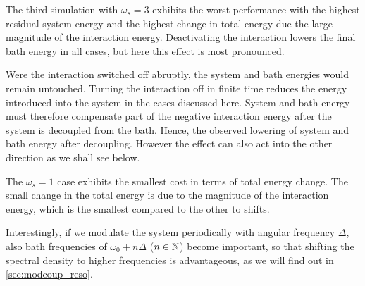 The third simulation with \(ω_s=3\) exhibits the worst performance
with the highest residual system energy and the highest change in
total energy due the large magnitude of the interaction energy.
Deactivating the interaction lowers the final bath energy in all
cases, but here this effect is most pronounced.

Were the interaction switched off abruptly, the system and bath
energies would remain untouched. Turning the interaction off in finite
time reduces the energy introduced into the system in the cases
discussed here. System and bath energy must therefore compensate part
of the negative interaction energy after the system is decoupled from
the bath. Hence, the observed lowering of system and bath energy after
decoupling. However the effect can also act into the other direction
as we shall see below.

The \(ω_{s}=1\) case exhibits the smallest cost in terms of total
energy change.  The small change in the total energy is due to the
magnitude of the interaction energy, which is the smallest compared to
the other to shifts.

Interestingly, if we modulate the system periodically with angular
frequency \(Δ\), also bath frequencies of \(ω_{0} + n Δ\)
(\(n\in\mathbb{N}\)) become important, so that shifting the spectral density
to higher frequencies is advantageous, as we will find out in
\cref{sec:modcoup_reso}.



